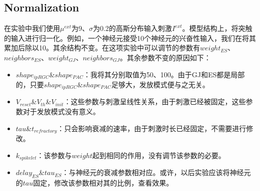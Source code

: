 \documentclass[lang=cn,11pt,a4paper,cite=numbers]{elegantpaper}
\begin{document}
\subsection{Normalization}
  在实验中我们使用$\mu^{ext}$为9、$\sigma$为0.2的高斯分布输入刺激$I^{ext}$。模型结构上，将突触的输入进行归一化。例如，一个神经元接受10个神经元的兴奋性输入，我们在将其累加后除以10。其余结构不变。在这项实验中可以调节的参数有$weight_{ES}$、$neighbors_{ES}$、$weight_{GJ}$、$neighbors_{GJ}$。其余参数不变的原因如下：
\begin{itemize}
  \item $shape_{ipRGC}$\&$shape_{PAC}$：我将其分别取值为50、100。由于GJ和ES都是局部的，只要$shape_{ipRGC}$\&$shape_{PAC}$足够大，发放模式便与之无关。
  \item $V_{reset}$\&$V_{th}$\&$V_{init}$：这些参数与刺激呈线性关系，由于刺激已经被固定，这些参数对于发放模式没有意义。
  \item $tau$\&$t_{refractory}$：只会影响衰减的速率，由于刺激时长已经固定，不需要进行修改。
  \item $k_{spikelet}$：该参数与$weight$起到相同的作用，没有调节该参数的必要。
  \item $delay_{ES}$\&$tau_{ES}$：与神经元的衰减参数相对应。或许，以后实验应该将神经元的$tau$固定，修改该参数相对其的比例，查看效果。
\end{itemize}
\end{document}
